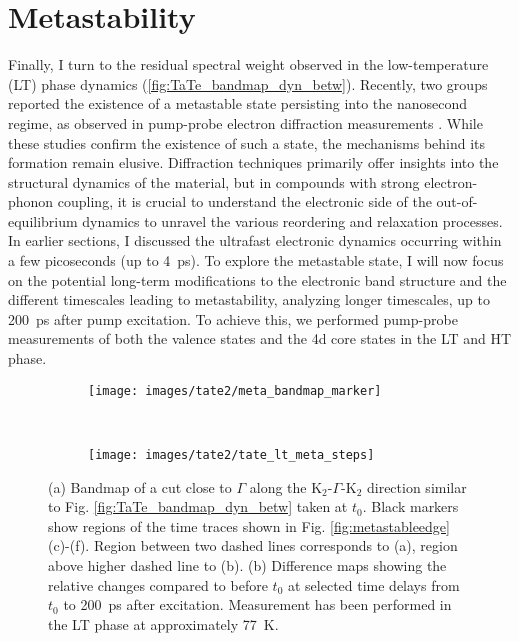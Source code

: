\section{Metastability}
\label{sec:meta}

Finally, I turn to the residual spectral weight observed in the low-temperature (LT) phase dynamics (\ref{fig:TaTe_bandmap_dyn_betw}).
Recently, two groups reported the existence of a metastable state persisting into the nanosecond regime, as observed in pump-probe electron diffraction measurements \cite{siddiqui_ultrafast_2021, domrose_femtosecond_2024}.
While these studies confirm the existence of such a state, the mechanisms behind its formation remain elusive.
Diffraction techniques primarily offer insights into the structural dynamics of the material, but in compounds with strong electron-phonon coupling, it is crucial to understand the electronic side of the out-of-equilibrium dynamics to unravel the various reordering and relaxation processes.
In earlier sections, I discussed the ultrafast electronic dynamics occurring within a few picoseconds (up to \qty{4}{\pico\second}).
To explore the metastable state, I will now focus on the potential long-term modifications to the electronic band structure and the different timescales leading to metastability, analyzing longer timescales, up to \qty{200}{\pico\second} after pump excitation.
To achieve this, we performed pump-probe measurements of both the valence states and the  4d core states in the LT and HT phase.

\begin{figure}[b!]
	\centering
	\begin{subfigure}[b]{0.25\textwidth}
		\texttt{[image: images/tate2/meta\_bandmap\_marker]}
		\caption{}
	\end{subfigure}
	\\
	\begin{subfigure}[b]{\textwidth}
		\texttt{[image: images/tate2/tate\_lt\_meta\_steps]}
		\caption{}
	\end{subfigure}
	\caption{(a) Bandmap of a cut close to $\Gamma$ along the K$_2$-$\Gamma$-K$_2$ direction similar to Fig. \ref{fig:TaTe_bandmap_dyn_betw} taken at $t_0$. Black markers show regions of the time traces shown in Fig. \ref{fig:metastableedge} (c)-(f). Region between two dashed lines corresponds to (a), region above higher dashed line to (b). (b) Difference maps showing the relative changes compared to before $t_0$ at selected time delays from $t_0$ to \qty{200}{\pico\second} after excitation. Measurement has been performed in the LT phase at approximately \qty{77}{\kelvin}.}
	\label{fig:tateltmetasteps}
\end{figure}

